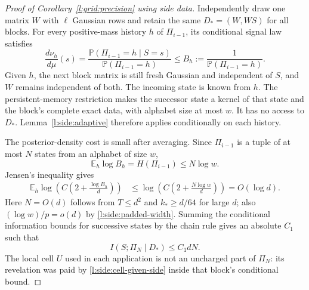\begin{proof}[Proof of Corollary~\ref{l:grid:precision} using side data]
Independently draw one matrix $W$ with $\ell$ Gaussian rows and retain
the same $D_*=(W,WS)$ for all blocks.  For every positive-mass history
$h$ of $\Pi_{i-1}$, its conditional signal law satisfies
\begin{equation}\label{l:side:history-density}
 \frac{d\nu_h}{d\mu}(s)
 =\frac{\mathbb P(\Pi_{i-1}=h\mid S=s)}
        {\mathbb P(\Pi_{i-1}=h)}
 \le B_h:=\frac1{\mathbb P(\Pi_{i-1}=h)}.
\end{equation}
Given $h$, the next block matrix is still fresh Gaussian and independent
of $S$, and $W$ remains independent of both.  The incoming state is known
from $h$.  The persistent-memory restriction makes the successor state
a kernel of that state and the block's complete exact data, with alphabet
size at most $w$.  It has no access to $D_*$.  Lemma~\ref{l:side:adaptive}
therefore applies conditionally on each history.

The posterior-density cost is small after averaging.  Since $\Pi_{i-1}$
is a tuple of at most $N$ states from an alphabet of size $w$,
\[
 \mathbb E_h\log B_h=H(\Pi_{i-1})\le N\log w.
\]
Jensen's inequality gives
\begin{align*}
 \mathbb E_h\log\left(C\left(2+\frac{\log B_h}{d}\right)\right)
 &\le\log\left(C\left(2+\frac{N\log w}{d}\right)\right)
 =O(\log d).
\end{align*}
Here $N=O(d)$ follows from $T\le d^2$ and $k_*\ge d/64$ for large $d$;
also $(\log w)/p=o(d)$ by \eqref{l:side:padded-width}.  Summing the
conditional information bounds for successive states by the chain rule
gives an absolute $C_1$ such that
\begin{equation}\label{l:side:transcript-upper}
 I(S;\Pi_N\mid D_*)\le C_1dN.
\end{equation}
The local cell $U$ used in each application is not an uncharged part of
$\Pi_N$: its revelation was paid by \eqref{l:side:cell-given-side} inside
that block's conditional bound.


\end{proof}
